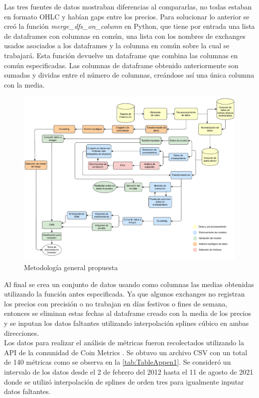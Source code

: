 Las tres fuentes de datos mostraban diferencias al compararlas, no todas estaban en formato OHLC y habían gaps entre los precios. Para solucionar lo anterior se creó la función \emph{merge\_dfs\_on\_column} en Python, que tiene por entrada una lista de dataframes con columnas en común, una lista con los nombres de exchanges usados asociados a los dataframes y la columna en común sobre la cual se trabajará. Esta función devuelve un dataframe que combina las columnas en común especificadas. Las columnas de dataframe obtenido anteriormente son sumadas y dividas entre el número de columnas, creándose así una única columna con la media.
\begin{landscape}
	\begin{figure}[h]
		\centering
		\includegraphics[scale=0.7]{Chapter3/Meto-3.pdf}
		\caption{Metodología general propuesta}
		\label{fig4}
	\end{figure}
\end{landscape}
Al final se crea un conjunto de datos usando como columnas las medias obtenidas utilizando la función antes especificada. Ya que algunos exchanges no registran los precios con precisión o no trabajan en días festivos o fines de semana, entonces se eliminan estas fechas al dataframe creado con la media de los precios y se inputan los datos faltantes utilizando interpolación splines cúbico en ambas direcciones.\\
Los datos para realizar el análisis de métricas fueron recolectados utilizando la API de la comunidad de Coin Metrics \cite{APIBasics}. Se obtuvo un archivo CSV con un total de 140 métricas como se observa en la \autoref{tab:TableAppen1}. Se consideró un intervalo de los datos desde el 2 de febrero del 2012 hasta el 11 de agosto de 2021 donde se utilizó interpolación de splines de orden tres para igualmente inputar datos faltantes.

